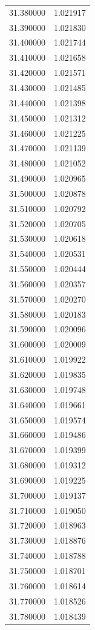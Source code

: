 \begin{tabular}{rr}
31.380000 & 1.021917 \\
31.390000 & 1.021830 \\
31.400000 & 1.021744 \\
31.410000 & 1.021658 \\
31.420000 & 1.021571 \\
31.430000 & 1.021485 \\
31.440000 & 1.021398 \\
31.450000 & 1.021312 \\
31.460000 & 1.021225 \\
31.470000 & 1.021139 \\
31.480000 & 1.021052 \\
31.490000 & 1.020965 \\
31.500000 & 1.020878 \\
31.510000 & 1.020792 \\
31.520000 & 1.020705 \\
31.530000 & 1.020618 \\
31.540000 & 1.020531 \\
31.550000 & 1.020444 \\
31.560000 & 1.020357 \\
31.570000 & 1.020270 \\
31.580000 & 1.020183 \\
31.590000 & 1.020096 \\
31.600000 & 1.020009 \\
31.610000 & 1.019922 \\
31.620000 & 1.019835 \\
31.630000 & 1.019748 \\
31.640000 & 1.019661 \\
31.650000 & 1.019574 \\
31.660000 & 1.019486 \\
31.670000 & 1.019399 \\
31.680000 & 1.019312 \\
31.690000 & 1.019225 \\
31.700000 & 1.019137 \\
31.710000 & 1.019050 \\
31.720000 & 1.018963 \\
31.730000 & 1.018876 \\
31.740000 & 1.018788 \\
31.750000 & 1.018701 \\
31.760000 & 1.018614 \\
31.770000 & 1.018526 \\
31.780000 & 1.018439 \\

\end{tabular}
